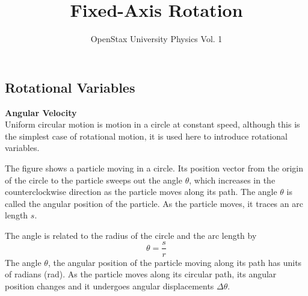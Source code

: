 \documentclass[a4paper]{article}
\title{Fixed-Axis Rotation}
\author{OpenStax University Physics Vol. 1}
\let\bf\textbf
\def\centerarc[#1](#2)(#3:#4:#5){\draw[#1] ($(#2)+({#5*cos(#3)},{#5*sin(#3)})$) arc (#3:#4:#5)}
\begin{document}
\setcounter{section}{10}
\maketitle
\subsection{Rotational Variables}
\noindent\bf{Angular Velocity}
\vspace{2mm}\\
Uniform circular motion is motion in a circle at constant speed, although this is the simplest case of rotational motion, it is used here to introduce rotational variables.\par
The figure shows a particle moving in a circle. Its position vector from the origin of the circle to the particle sweeps out the angle $\theta$, which increases in the counterclockwise direction as the particle moves along its path. The angle $\theta$ is called the angular position of the particle. As the particle moves, it traces an arc length $s$.
\begin{center}
\end{center}
The angle is related to the radius of the circle and the arc length by 
\begin{equation}
    \theta = \frac{s}{r}
\end{equation}
The angle $\theta$, the angular position of the particle moving along its path has units of radians (rad). As the particle moves along its circular path, its angular position changes and it undergoes angular displacements $\Delta\theta$.\par\vspace{1mm}
\end{document}
